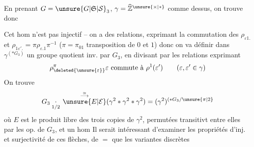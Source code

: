 En prenant $G={\unsure{G|\mathfrak S|\mathcal S}}_3$, $\gamma=\widehat{\mathbb Z}^{\unsure{\times|*}}$ comme dessus, on trouve donc

Cet hom n'est pas injectif -- on a des relations,   exprimant la commutation des $\rho_{\varepsilon1.}$ et $\rho_{1\varepsilon'.}=\pi\rho_{\varepsilon.1}\pi^{-1}$ ($\pi=\pi_{01}$ transposition de $0$ et $1$) donc on va définir dans $\gamma^{(*G_3)}$ un groupe quotient inv. par $G_3$, en divisant par les relations exprimant
\[
\rho^{\pi}_{\deleted{\unsure{\varepsilon}}}\varepsilon\ \text{commute à}\ \rho^1(\varepsilon')\qquad
(\varepsilon,\varepsilon'\in\gamma)
\]
On trouve
\[
G_3\underset{1/2}{\cdot}\,\overset{\overset{\simeq}{\longrightarrow}}{\unsure{E|\mathcal E}}
(\gamma^2*\gamma^2*\gamma^2)=(\gamma^2)^{(*G_3/\unsure{\pi|2}}
\]
où $E$ est le produit libre  des trois copies de $\gamma^2$, permutées transitivt entre elles par les op. de $G_3$, et un hom
Il serait intéressant d'examiner les propriétés d'inj. et surjectivité de ces flèches, de $=$ que les variantes discrètes
